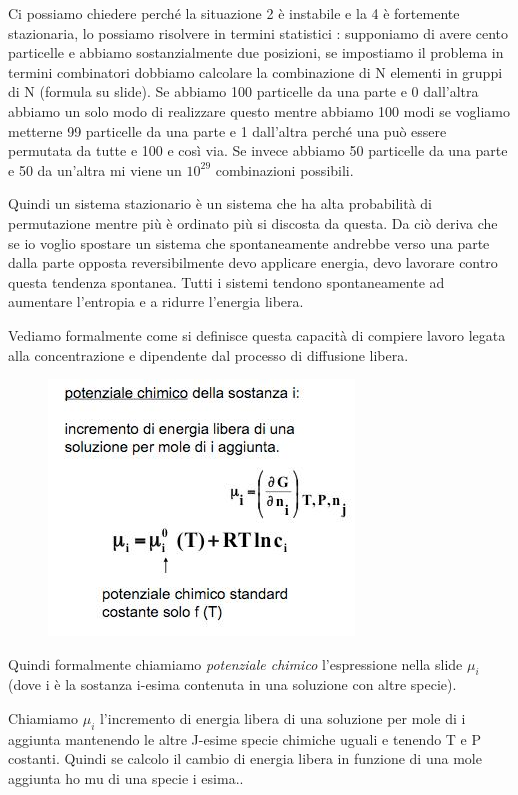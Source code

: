 \documentclass[a4paper,12pt]{article}
\begin{document}
Ci possiamo chiedere perché la situazione 2 è instabile e la 4 è fortemente stazionaria,  lo possiamo risolvere in termini statistici : supponiamo di avere cento particelle e abbiamo sostanzialmente due posizioni, se impostiamo il problema in termini combinatori dobbiamo calcolare la combinazione di N elementi in gruppi di N (formula su slide).
Se abbiamo 100 particelle da una parte e 0 dall'altra abbiamo un solo modo di realizzare questo mentre abbiamo 100 modi se vogliamo metterne 99 particelle da una parte e 1 dall'altra perché una può essere permutata da tutte e 100 e così via.
Se invece abbiamo 50 particelle da una parte e 50 da un'altra mi viene un $10^{29}$ combinazioni possibili.

Quindi un sistema stazionario è un sistema che ha alta probabilità di permutazione mentre più è ordinato più si discosta da questa. Da ciò deriva che se io voglio spostare un sistema che spontaneamente andrebbe verso una parte dalla parte opposta reversibilmente devo applicare energia, devo lavorare contro questa tendenza spontanea.
Tutti i sistemi tendono spontaneamente ad aumentare l'entropia e a ridurre l'energia libera.

Vediamo formalmente come si definisce questa capacità di compiere lavoro legata alla concentrazione e dipendente dal processo di diffusione libera.
\begin{figure}[H]
\centering
\includegraphics[scale=0.4]{immagine/pot_chimico.jpg}
\caption{}
\end{figure}

Quindi formalmente chiamiamo \emph{potenziale chimico} l'espressione nella slide $\mu_{i}$ (dove i è la sostanza i-esima contenuta in una soluzione con altre specie). 

Chiamiamo $\mu_{i}$ l’incremento di energia libera di una soluzione per mole di i aggiunta mantenendo le altre J-esime specie chimiche uguali e tenendo T e P costanti.
Quindi se calcolo il cambio di energia libera in funzione di una mole aggiunta ho mu di una specie i esima..
\end{document}
